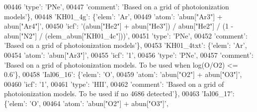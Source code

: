 \begin{DoxyCode}
00446                                      \textcolor{stringliteral}{'type'}: \textcolor{stringliteral}{'PNe'},
00447                                      \textcolor{stringliteral}{'comment'}: \textcolor{stringliteral}{'Based on a grid of photoionization models'}\},
00448                          \textcolor{stringliteral}{'KH01\_4g'}: \{\textcolor{stringliteral}{'elem'}: \textcolor{stringliteral}{'Ar'},
00449                                      \textcolor{stringliteral}{'atom'}: \textcolor{stringliteral}{'abun["Ar3"] + abun["Ar4"]'},
00450                                      \textcolor{stringliteral}{'icf'}: \textcolor{stringliteral}{'(abun["He2"] + abun["He3"]) / abun["He2"] / (1 -  abun["N2"] /
       (elem\_abun["KH01\_4c"]))'},
00451                                      \textcolor{stringliteral}{'type'}: \textcolor{stringliteral}{'PNe'},
00452                                      \textcolor{stringliteral}{'comment'}: \textcolor{stringliteral}{'Based on a grid of photoionization models'}\},
00453                          \textcolor{stringliteral}{'KH01\_4txt'}: \{\textcolor{stringliteral}{'elem'}: \textcolor{stringliteral}{'Ar'},
00454                                      \textcolor{stringliteral}{'atom'}: \textcolor{stringliteral}{'abun["Ar3"]'},
00455                                      \textcolor{stringliteral}{'icf'}: \textcolor{stringliteral}{'1'},
00456                                      \textcolor{stringliteral}{'type'}: \textcolor{stringliteral}{'PNe'},
00457                                      \textcolor{stringliteral}{'comment'}: \textcolor{stringliteral}{'Based on a grid of photoionization models. To be used when
       log(O/O2) <= 0.6'}\},
00458                          \textcolor{stringliteral}{'Ial06\_16'}: \{\textcolor{stringliteral}{'elem'}: \textcolor{stringliteral}{'O'},
00459                                       \textcolor{stringliteral}{'atom'}: \textcolor{stringliteral}{'abun["O2"] + abun["O3"]'},
00460                                       \textcolor{stringliteral}{'icf'}: \textcolor{stringliteral}{'1'},
00461                                       \textcolor{stringliteral}{'type'}: \textcolor{stringliteral}{'HII'},
00462                                       \textcolor{stringliteral}{'comment'}: \textcolor{stringliteral}{'Based on a grid of photoionization models. To be used if
       no 4686 detected'}\},
00463                          \textcolor{stringliteral}{'Ial06\_17'}: \{\textcolor{stringliteral}{'elem'}: \textcolor{stringliteral}{'O'},
00464                                       \textcolor{stringliteral}{'atom'}: \textcolor{stringliteral}{'abun["O2"] + abun["O3"]'},

\end{DoxyCode}
